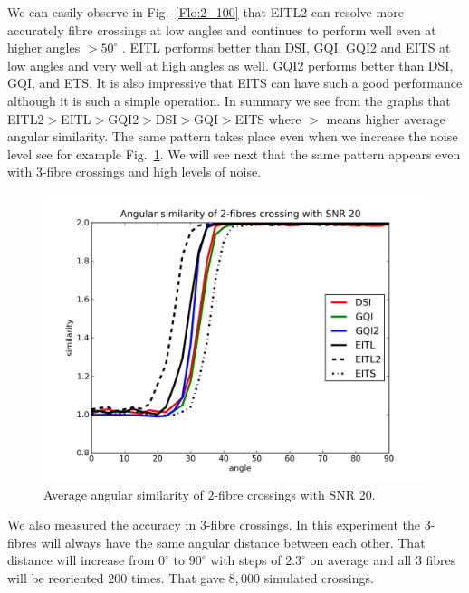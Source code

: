 \documentclass{bioinfo}
\begin{document}
We can easily observe in Fig.~\ref{Flo:2_100} that EITL2 can resolve
more accurately fibre crossings at low angles and continues to perform
well even at higher angles $>50^{\circ}$ . EITL performs better than
DSI, GQI, GQI2 and EITS at low angles and very well at high angles
as well. GQI2 performs better than DSI, GQI, and ETS. It is also impressive
that EITS can have such a good performance although it is such a simple
operation. In summary we see from the graphs that EITL2$>$EITL$>$GQI2$>$DSI$>$GQI$>$EITS
where $>$ means higher average angular similarity. The same pattern
takes place even when we increase the noise level see for example
Fig.~\ref{Flo:2_20}. We will see next that the same pattern appears
even with 3-fibre crossings and high levels of noise.

%
\begin{figure}
\begin{centering}
\includegraphics[scale=0.5]{figures/2_20}
\par\end{centering}

\caption{Average angular similarity of $2$-fibre crossings with SNR 20. }


\label{Flo:2_20}
\end{figure}


We also measured the accuracy in $3$-fibre crossings. In this experiment
the $3$-fibres will always have the same angular distance between
each other. That distance will increase from \foreignlanguage{british}{$0^{\circ}$
to $90^{\circ}$ }with steps of $2.3^{\circ}$ on average and all
$3$ fibres will be reoriented $200$ times. That gave $8,000$ simulated
crossings. 
\end{document}
